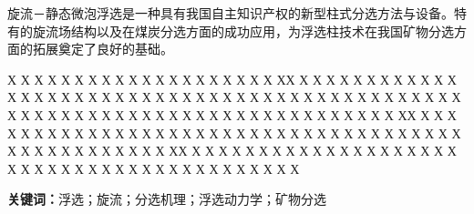 \begin{cnabstract}
	旋流－静态微泡浮选是一种具有我国自主知识产权的新型柱式分选方法与设备。特有的旋流场结构以及在煤炭分选方面的成功应用，为浮选柱技术在我国矿物分选方面的拓展奠定了良好的基础\cite{wx3}。\par 
	Х Х Х Х Х Х Х Х Х Х Х  Х Х Х Х Х Х Х Х Х ХХ Х Х Х Х Х  Х Х Х Х Х Х Х Х Х Х Х Х Х Х Х Х Х Х Х Х Х Х Х Х Х Х Х Х Х Х Х Х Х Х Х Х Х Х Х Х Х Х Х Х Х Х Х Х  Х Х Х Х Х Х Х Х Х Х Х Х Х Х Х Х  Х Х Х Х Х Х ХХ Х Х Х Х Х Х Х Х Х Х Х Х Х Х Х Х Х Х Х Х Х Х Х Х Х Х Х Х Х Х Х Х Х Х Х Х Х Х Х Х  Х Х Х Х Х Х Х Х Х ХХ Х Х Х Х Х Х Х Х Х Х Х Х Х Х Х Х Х Х Х Х Х Х Х Х Х Х Х Х Х Х Х Х Х Х Х Х Х Х Х Х Х Х \par
	{\noindent \textbf{关键词：}}浮选；旋流；分选机理；浮选动力学；矿物分选
\end{cnabstract}


